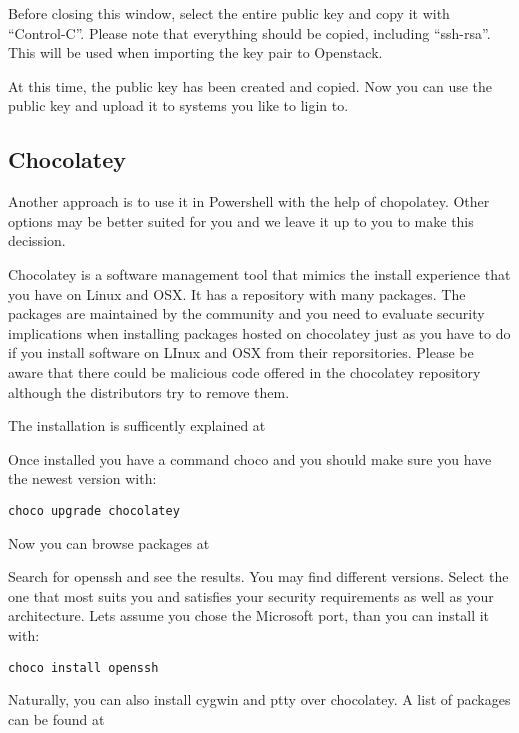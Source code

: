Before closing this window, select the entire public key and copy it
with ``Control-C''. Please note that everything should be copied,
including ``ssh-rsa''. This will be used when importing the key pair to
Openstack.

At this time, the public key has been created and copied. Now you can
use the public key and upload it to systems you like to ligin to.


\subsection{Chocolatey}

Another approach is to use it in Powershell with the help of
chopolatey. Other options may be better suited for you and we leave it
up to you to make this decission. 

Chocolatey is a software management tool that mimics the install
experience that you have on Linux and OSX. It has a repository with
many packages. The packages are maintained by the community and you
need to evaluate security implications when installing packages hosted
on chocolatey just as you have to do if you install software on LInux
and OSX from their reporsitories.  Please be aware that there could be
malicious code offered in the chocolatey repository although the
distributors try to remove them.

The installation is sufficently explained at


Once installed you have a command choco and you should make sure you
have the newest version with:

\begin{verbatim}
choco upgrade chocolatey
\end{verbatim}

Now you can browse packages at


Search for openssh and see the results. You may find different versions.
Select the one that most suits you and satisfies your security
requirements as well as your architecture. Lets assume you chose the
Microsoft port, than you can install it with:

\begin{verbatim}
choco install openssh
\end{verbatim}

Naturally, you can also install cygwin and ptty over chocolatey. A
list of packages can be found at 

